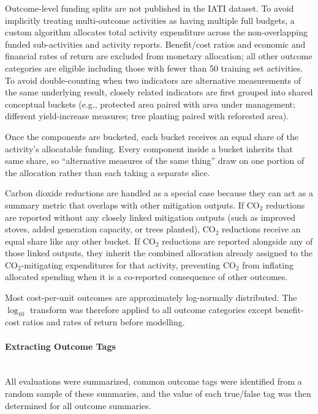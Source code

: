 \documentclass[12pt,a4paper]{article}
\newcommand{\subsubsubsection}[1]{\paragraph{#1}\mbox{}\\}
\begin{document}
Outcome-level funding splits are not published in the IATI dataset. To avoid implicitly treating multi-outcome activities as having multiple full budgets, a custom algorithm allocates total activity expenditure across the non-overlapping funded sub-activities and activity reports. Benefit/cost ratios and economic and financial rates of return are excluded from monetary allocation; all other outcome categories are eligible including those with fewer than 50 training set activities. To avoid double-counting when two indicators are alternative measurements of the same underlying result, closely related indicators are first grouped into shared conceptual buckets (e.g., protected area paired with area under management; different yield-increase measures; tree planting paired with reforested area).

Once the components are bucketed, each bucket receives an equal share of the activity’s allocatable funding. Every component inside a bucket inherits that same share, so ``alternative measures of the same thing'' draw on one portion of the allocation rather than each taking a separate slice.

Carbon dioxide reductions are handled as a special case because they can act as a summary metric that overlaps with other mitigation outputs. If CO$_2$ reductions are reported without any closely linked mitigation outputs (such as improved stoves, added generation capacity, or trees planted), CO$_2$ reductions receive an equal share like any other bucket. If CO$_2$ reductions are reported alongside any of those linked outputs, they inherit the combined allocation already assigned to the CO$_2$-mitigating expenditures for that activity, preventing CO$_2$ from inflating allocated spending when it is a co-reported consequence of other outcomes.

Most cost-per-unit outcomes are approximately log-normally distributed. The $\log_{10}$ transform was therefore applied to all outcome categories except benefit-cost ratios and rates of return before modelling.


\subsubsubsection{Extracting Outcome Tags} \label{sec:outcome_tags_methods}
All evaluations were summarized, common outcome tags were identified from a random sample of these summaries, and the value of each true/false tag was then determined for all outcome summaries.
\end{document}
